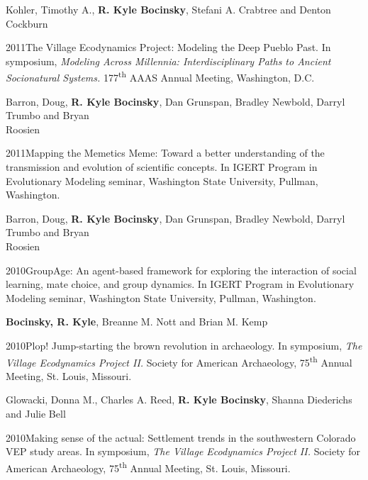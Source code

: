 Kohler, Timothy A., {\bf R. Kyle Bocinsky}, Stefani A. Crabtree and Denton Cockburn
\nopagebreak
\begin{list1}
\item[] 2011\hspace{.2cm}The Village Ecodynamics Project: Modeling the Deep Pueblo Past. In symposium, \emph{Modeling Across Millennia: Interdisciplinary Paths to Ancient Socionatural Systems.} 177\textsuperscript{th} AAAS Annual Meeting, Washington, D.C.
\end{list1}

\newpage
Barron, Doug, {\bf R. Kyle Bocinsky}, Dan Grunspan, Bradley Newbold, Darryl Trumbo and Bryan \\Roosien
\nopagebreak
\begin{list1}
\item[] 2011\hspace{.2cm}Mapping the Memetics Meme: Toward a better understanding of the transmission and evolution of scientific concepts. In IGERT Program in Evolutionary Modeling seminar, Washington State University, Pullman, Washington.
\end{list1}


Barron, Doug, {\bf R. Kyle Bocinsky}, Dan Grunspan, Bradley Newbold, Darryl Trumbo and Bryan \\Roosien
\nopagebreak
\begin{list1}
\item[] 2010\hspace{.2cm}GroupAge: An agent-based framework for exploring the interaction of social learning, mate choice, and group dynamics. In IGERT Program in Evolutionary Modeling seminar, Washington State University, Pullman, Washington.
\end{list1}


{\bf Bocinsky, R. Kyle}, Breanne M. Nott and Brian M. Kemp
\nopagebreak
\begin{list1}
\item[] 2010\hspace{.2cm}Plop! Jump-starting the brown revolution in archaeology. In symposium, \emph{The Village Ecodynamics Project II.} Society for American Archaeology, 75\textsuperscript{th} Annual Meeting, St. Louis, Missouri.
\end{list1}


Glowacki, Donna M., Charles A. Reed, {\bf R. Kyle Bocinsky}, Shanna Diederichs and Julie Bell
\nopagebreak
\begin{list1}
\item[] 2010\hspace{.2cm}Making sense of the actual: Settlement trends in the southwestern Colorado VEP study areas. In symposium, \emph{The Village Ecodynamics Project II.} Society for American Archaeology, 75\textsuperscript{th} Annual Meeting, St. Louis, Missouri.
\end{list1}


